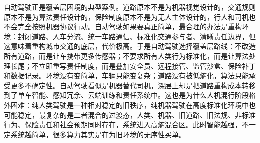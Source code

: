 自动驾驶正是覆盖层困境的典型案例\cite{kalra2016}。道路原本不是为机器视觉设计的，交通规则原本不是为算法责任设计的，保险制度原本不是为无人主体设计的，行人和司机也不会完全按照机器协议行动。自动驾驶如果要真正简单，最合理的办法是重构环境：封闭道路、人车分流、统一车路通信、标准化交通参与者、清晰责任边界，但这意味着重构城市交通的底层，代价极高。于是自动驾驶选择覆盖层路线：不改造所有道路，而是让车携带更多传感器；不要求所有人类行为标准化，而是让算法处理长尾；不立即重写责任制度，而是叠加安全员、远程接管、监管沙盒、保险补丁和数据记录。环境没有变简单，车辆只能变复杂；道路没有被低熵化，算法只能承受更多不确定性。自动驾驶看似是机器替代司机，深层上却是把道路重构成本转移到了单车智能、感知冗余、云端训练和责任系统中。这也是为什么人机混行阶段格外困难：纯人类驾驶是一种相对稳定的旧秩序，纯机器驾驶在高度标准化环境中也可能稳定，最复杂的是二者混合的过渡态，人类、机器、旧道路、旧法规、非标准行为、保险责任和社会预期同时存在，系统进入高熵混合区。此时智能越强，不一定系统越简单，很多算力其实是在为旧环境的无序性买单。
